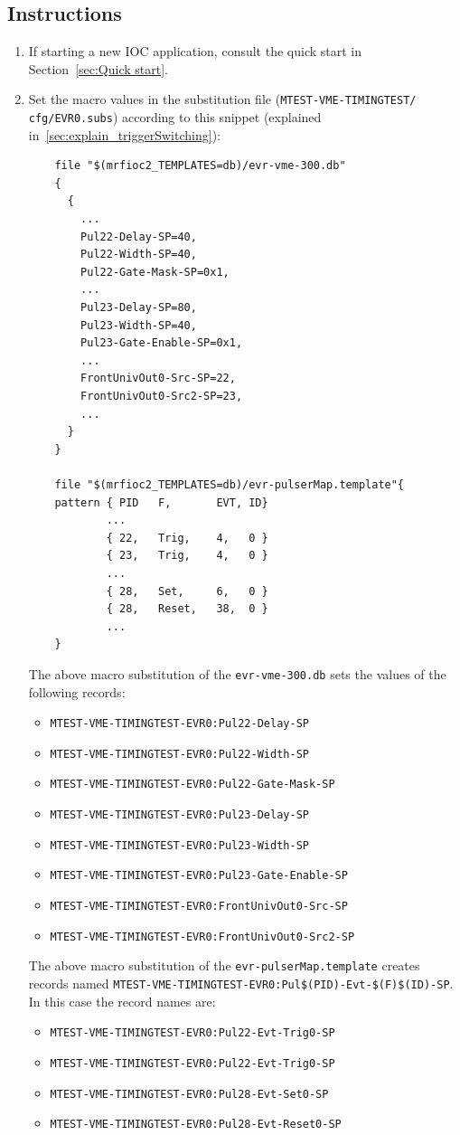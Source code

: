 \documentclass[12pt,a4paper]{article}
\begin{document}
\subsection{Instructions}\label{sec:instructions_triggerSwitching}
\begin{enumerate}
	\item If starting a new IOC application, consult the quick start in Section~\ref{sec:Quick start}. 

	\item \label{sec:gating_instructions1_setMacro} Set the macro values in the substitution file (\texttt{MTEST-VME-TIMINGTEST/} \texttt{cfg/EVR0.subs}) according to this snippet (explained in~\ref{sec:explain_triggerSwitching}):
\begin{verbatim}
	file "$(mrfioc2_TEMPLATES=db)/evr-vme-300.db"
	{
	  {
	    ...
	    Pul22-Delay-SP=40,
	    Pul22-Width-SP=40,
	    Pul22-Gate-Mask-SP=0x1,
	    ...
	    Pul23-Delay-SP=80,
	    Pul23-Width-SP=40,
	    Pul23-Gate-Enable-SP=0x1,
	    ...
	    FrontUnivOut0-Src-SP=22,
	    FrontUnivOut0-Src2-SP=23,
	    ...
	  }
	}

	file "$(mrfioc2_TEMPLATES=db)/evr-pulserMap.template"{
	pattern { PID   F,       EVT, ID}
	        ...
	        { 22,   Trig,    4,   0 }
	        { 23,   Trig,    4,   0 }
	        ...
	        { 28,   Set,     6,   0 }
	        { 28,   Reset,   38,  0 }
	        ...
	}
\end{verbatim}
	The above macro substitution of the \texttt{evr-vme-300.db} sets the values of the following records:
	\begin{itemize}
		\item \texttt{MTEST-VME-TIMINGTEST-EVR0:Pul22-Delay-SP}
		\item \texttt{MTEST-VME-TIMINGTEST-EVR0:Pul22-Width-SP}
		\item \texttt{MTEST-VME-TIMINGTEST-EVR0:Pul22-Gate-Mask-SP}
		\item \texttt{MTEST-VME-TIMINGTEST-EVR0:Pul23-Delay-SP}
		\item \texttt{MTEST-VME-TIMINGTEST-EVR0:Pul23-Width-SP}
		\item \texttt{MTEST-VME-TIMINGTEST-EVR0:Pul23-Gate-Enable-SP}
		\item \texttt{MTEST-VME-TIMINGTEST-EVR0:FrontUnivOut0-Src-SP}
		\item \texttt{MTEST-VME-TIMINGTEST-EVR0:FrontUnivOut0-Src2-SP}
	\end{itemize}
	The above macro substitution of the \texttt{evr-pulserMap.template} creates records named \texttt{MTEST-VME-TIMINGTEST-EVR0:Pul\$(PID)-Evt-\$(F)\$(ID)-SP}. In this case the record names are:
	\begin{itemize}
		\item \texttt{MTEST-VME-TIMINGTEST-EVR0:Pul22-Evt-Trig0-SP}
		\item \texttt{MTEST-VME-TIMINGTEST-EVR0:Pul22-Evt-Trig0-SP}
		\item \texttt{MTEST-VME-TIMINGTEST-EVR0:Pul28-Evt-Set0-SP}
		\item \texttt{MTEST-VME-TIMINGTEST-EVR0:Pul28-Evt-Reset0-SP}
	\end{itemize}
	

\end{enumerate}
\end{document}
